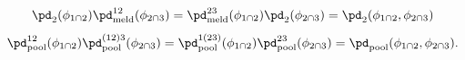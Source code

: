 \begin{gather}
  \pd_{2}(\phi_{1 \cap 2}) \pd_{\text{meld}}^{12}(\phi_{2 \cap 3}) =
  \pd_{\text{meld}}^{23}(\phi_{1 \cap 2}) \pd_{2}(\phi_{2 \cap 3}) = 
  \pd_{2}(\phi_{1 \cap 2}, \phi_{2 \cap 3}) 
  \label{eqn:coinciding-equalities-one}
  \\[1ex]
  \pd_{\text{pool}}^{12}(\phi_{1 \cap 2}) \pd_{\text{pool}}^{(12)3}(\phi_{2 \cap 3}) =
  \pd_{\text{pool}}^{1(23)}(\phi_{1 \cap 2}) \pd_{\text{pool}}^{23}(\phi_{2 \cap 3}) = 
  \pd_{\text{pool}}(\phi_{1 \cap 2}, \phi_{2 \cap 3}).
  \label{eqn:coinciding-equalities-two}
\end{gather}